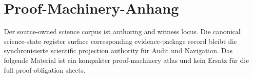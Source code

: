 \section{Proof-Machinery-Anhang}
\label{sec:oc13-proof-machinery-appendix-de}

Der source-owned science corpus ist authoring and witness locus. Die canonical
science-state register surface
corresponding evidence-package record
bleibt die synchronisierte scientific projection authority für Audit und
Navigation. Das folgende Material ist ein kompakter proof-machinery atlas und
kein Ersatz für die full proof-obligation sheets.

\begingroup
\footnotesize
\RaggedRight
\sloppy
\setlength{\tabcolsep}{2pt}
\setlength{\LTleft}{0pt}
\setlength{\LTright}{0pt}

\endgroup
